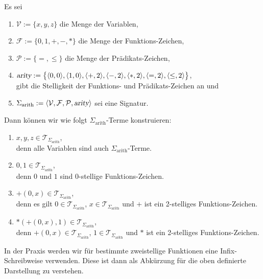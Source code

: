 \example
Es sei 
\begin{enumerate}
\item $\mathcal{V} := \{ x, y, z \}$ die Menge der Variablen,
\item $\mathcal{F} := \{ 0, 1, \mathtt{+}, \mathtt{-}, * \}$ die Menge der Funktions-Zeichen,
\item $\mathcal{P} := \{\mathtt{=}, \leq\}$ die Menge der Prädikats-Zeichen,
\item $\textsl{arity} := \bigl\{ \pair(0,0), \pair(1,0), \pair(\mathtt{+},2), \pair(\mathtt{-},2),
  \pair(*,2), \pair(=,2), \pair(\leq,2) \bigr\}$, \\[0.2cm]
      gibt die Stelligkeit der Funktions- und Prädikats-Zeichen an und
\item $\Sigma_\mathrm{arith} := \langle \mathcal{V}, \mathcal{F}, \mathcal{P}, \textsl{arity} \rangle$
      sei eine Signatur.
\end{enumerate}
Dann können wir wie folgt $\Sigma_{\mathrm{arith}}$-Terme konstruieren:
\begin{enumerate}
\item $x, y, z \in \mathcal{T}_{\Sigma_{\mathrm{arith}}}$, \\[0.2cm]
      denn alle Variablen sind auch $\Sigma_{\mathrm{arith}}$-Terme.
\item $0, 1 \in \mathcal{T}_{\Sigma_{\mathrm{arith}}}$,  \\[0.2cm]
      denn $0$ und $1$ sind $0$-stellige Funktions-Zeichen.
\item $\mathtt{+}(0,x) \in \mathcal{T}_{\Sigma_{\mathrm{arith}}}$, \\[0.2cm]
      denn es gilt $0 \in \mathcal{T}_{\Sigma_{\mathrm{arith}}}$, $x \in \mathcal{T}_{\Sigma_{\mathrm{arith}}}$ und 
      $\mathtt{+}$ ist ein 2-stelliges Funktions-Zeichen.
\item $*(\mathtt{+}(0,x),1) \in \mathcal{T}_{\Sigma_{\mathrm{arith}}}$, \\[0.2cm]
      denn $\mathtt{+}(0,x) \in \mathcal{T}_{\Sigma_{\mathrm{arith}}}$, $1 \in \mathcal{T}_{\Sigma_{\mathrm{arith}}}$ und
      $*$ ist ein 2-stelliges Funktions-Zeichen.
\end{enumerate}
In der Praxis werden wir für bestimmte zweistellige Funktionen eine Infix-Schreibweise
verwenden.  Diese ist dann als Abkürzung für die oben definierte Darstellung zu verstehen.
\eox


